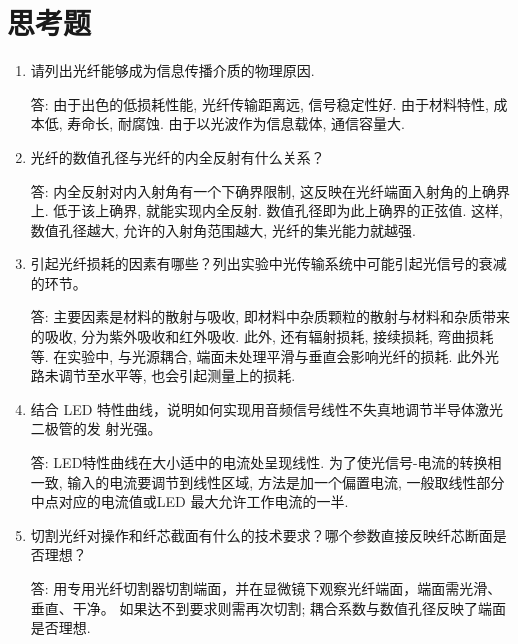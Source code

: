 \documentclass[12pt,a4paper]{article}
\begin{document}
\section{思考题}
\begin{enumerate}
    \item 请列出光纤能够成为信息传播介质的物理原因.
    
    答: 由于出色的低损耗性能, 光纤传输距离远, 信号稳定性好. 由于材料特性, 成本低, 寿命长, 耐腐蚀. 
    由于以光波作为信息载体, 通信容量大. 
    \item 光纤的数值孔径与光纤的内全反射有什么关系？
    
    答: 内全反射对内入射角有一个下确界限制, 这反映在光纤端面入射角的上确界上. 低于该上确界, 就能实现内全反射. 数值孔径即为此上确界的正弦值. 
    这样, 数值孔径越大, 允许的入射角范围越大, 光纤的集光能力就越强.
    \item 引起光纤损耗的因素有哪些？列出实验中光传输系统中可能引起光信号的衰减的环节。
    
    答: 主要因素是材料的散射与吸收, 即材料中杂质颗粒的散射与材料和杂质带来的吸收, 分为紫外吸收和红外吸收. 此外, 还有辐射损耗, 接续损耗, 弯曲损耗等.
    在实验中, 与光源耦合, 端面未处理平滑与垂直会影响光纤的损耗. 此外光路未调节至水平等, 也会引起测量上的损耗.
    \item 结合 LED 特性曲线，说明如何实现用音频信号线性不失真地调节半导体激光二极管的发
    射光强。
    
    答: LED特性曲线在大小适中的电流处呈现线性. 为了使光信号-电流的转换相一致, 输入的电流要调节到线性区域, 方法是加一个偏置电流, 一般取线性部分中点对应的电流值或LED 最大允许工作电流的一半.
    \item 切割光纤对操作和纤芯截面有什么的技术要求？哪个参数直接反映纤芯断面是否理想？
    
    答: 用专用光纤切割器切割端面，并在显微镜下观察光纤端面，端面需光滑、垂直、干净。
    如果达不到要求则需再次切割; 耦合系数与数值孔径反映了端面是否理想.
\end{enumerate}
\end{document}
